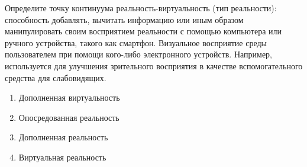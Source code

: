 
Определите точку континуума реальность-виртуальность (тип реальности): способность добавлять, вычитать информацию или иным образом манипулировать своим восприятием реальности с помощью компьютера или ручного устройства, такого как смартфон. Визуальное восприятие среды пользователем при помощи кого-либо электронного устройств. Например, используется для улучшения зрительного восприятия в качестве вспомогательного средства для слабовидящих.

\begin{enumerate}
    \item Дополненная виртуальность
    \item Опосредованная реальность
    \item Дополненная реальность
    \item Виртуальная реальность
\end{enumerate}